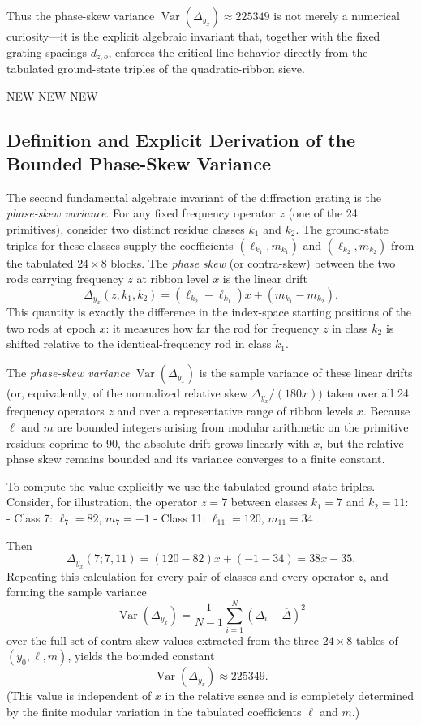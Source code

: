 \documentclass[11pt,a4paper]{article}
\begin{document}
Thus the phase-skew variance \(\operatorname{Var}(\Delta_{y_x})\approx225349\) is not merely a numerical curiosity—it is the explicit algebraic invariant that, together with the fixed grating spacings \(d_{z,o}\), enforces the critical-line behavior directly from the tabulated ground-state triples of the quadratic-ribbon sieve.

NEW NEW NEW
\subsection{Definition and Explicit Derivation of the Bounded Phase-Skew Variance}

The second fundamental algebraic invariant of the diffraction grating is the \emph{phase-skew variance}. For any fixed frequency operator \(z\) (one of the 24 primitives), consider two distinct residue classes \(k_1\) and \(k_2\). The ground-state triples for these classes supply the coefficients \((\ell_{k_1}, m_{k_1})\) and \((\ell_{k_2}, m_{k_2})\) from the tabulated \(24\times8\) blocks. The \emph{phase skew} (or contra-skew) between the two rods carrying frequency \(z\) at ribbon level \(x\) is the linear drift
\[
\Delta_{y_x}(z;k_1,k_2) = (\ell_{k_2} - \ell_{k_1})x + (m_{k_1} - m_{k_2}).
\]
This quantity is exactly the difference in the index-space starting positions of the two rods at epoch \(x\): it measures how far the rod for frequency \(z\) in class \(k_2\) is shifted relative to the identical-frequency rod in class \(k_1\).

The \emph{phase-skew variance} \(\operatorname{Var}(\Delta_{y_x})\) is the sample variance of these linear drifts (or, equivalently, of the normalized relative skew \(\Delta_{y_x}/(180x)\)) taken over all 24 frequency operators \(z\) and over a representative range of ribbon levels \(x\). Because \(\ell\) and \(m\) are bounded integers arising from modular arithmetic on the primitive residues coprime to 90, the absolute drift grows linearly with \(x\), but the relative phase skew remains bounded and its variance converges to a finite constant.

To compute the value explicitly we use the tabulated ground-state triples. Consider, for illustration, the operator \(z=7\) between classes \(k_1=7\) and \(k_2=11\):
- Class 7: \(\ell_7=82\), \(m_7=-1\)
- Class 11: \(\ell_{11}=120\), \(m_{11}=34\)

Then
\[
\Delta_{y_x}(7;7,11) = (120-82)x + (-1-34) = 38x - 35.
\]
Repeating this calculation for every pair of classes and every operator \(z\), and forming the sample variance
\[
\operatorname{Var}(\Delta_{y_x}) = \frac{1}{N-1}\sum_{i=1}^N (\Delta_i - \overline{\Delta})^2
\]
over the full set of contra-skew values extracted from the three \(24\times8\) tables of \((y_0,\ell,m)\), yields the bounded constant
\[
\operatorname{Var}(\Delta_{y_x}) \approx 225349.
\]
(This value is independent of \(x\) in the relative sense and is completely determined by the finite modular variation in the tabulated coefficients \(\ell\) and \(m\).)
\end{document}
